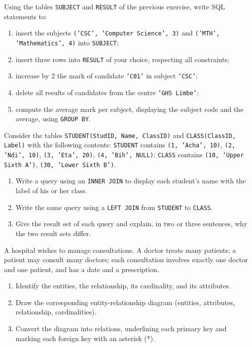\documentclass[11pt]{article}
\begin{document}
\begin{exercice}
Using the tables \texttt{SUBJECT} and \texttt{RESULT} of the previous exercise, write SQL statements to:
\begin{enumerate}
\item insert the subjects \texttt{('CSC', 'Computer Science', 3)} and \texttt{('MTH', 'Mathematics', 4)} into \texttt{SUBJECT};
\item insert three rows into \texttt{RESULT} of your choice, respecting all constraints;
\item increase by 2 the mark of candidate \texttt{'C01'} in subject \texttt{'CSC'};
\item delete all results of candidates from the centre \texttt{'GHS Limbe'};
\item compute the average mark per subject, displaying the subject code and the average, using \texttt{GROUP BY}.
\end{enumerate}
\end{exercice}

\begin{exercice}[Joins]
Consider the tables \texttt{STUDENT(StudID, Name, ClassID)} and \texttt{CLASS(ClassID, Label)} with the following contents: \texttt{STUDENT} contains \texttt{(1, 'Acha', 10)}, \texttt{(2, 'Ndi', 10)}, \texttt{(3, 'Eta', 20)}, \texttt{(4, 'Bih', NULL)}; \texttt{CLASS} contains \texttt{(10, 'Upper Sixth A')}, \texttt{(30, 'Lower Sixth B')}.
\begin{enumerate}
\item Write a query using an \texttt{INNER JOIN} to display each student's name with the label of his or her class.
\item Write the same query using a \texttt{LEFT JOIN} from \texttt{STUDENT} to \texttt{CLASS}.
\item Give the result set of each query and explain, in two or three sentences, why the two result sets differ.
\end{enumerate}
\end{exercice}

\begin{exercice}
A hospital wishes to manage consultations. A doctor treats many patients; a patient may consult many doctors; each consultation involves exactly one doctor and one patient, and has a date and a prescription.
\begin{enumerate}
\item Identify the entities, the relationship, its cardinality, and its attributes.
\item Draw the corresponding entity-relationship diagram (entities, attributes, relationship, cardinalities).
\item Convert the diagram into relations, underlining each primary key and marking each foreign key with an asterisk (*).
\end{enumerate}
\end{exercice}
\end{document}
